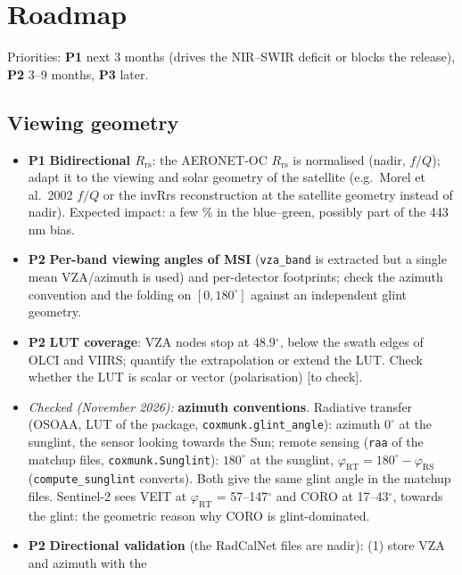 \documentclass[11pt,a4paper]{article}
\newcommand{\Rrs}{R_\mathrm{rs}}
\newcommand{\code}[1]{\texttt{#1}}
\newcommand{\todo}[1]{\textcolor{red!70!black}{[#1]}}
\newcommand{\prio}[1]{\textbf{\textcolor{blue!50!black}{#1}}}
\begin{document}
\section{Roadmap}

Priorities: \prio{P1} next 3 months (drives the NIR--SWIR deficit or blocks the release),
\prio{P2} 3--9 months, \prio{P3} later.

\subsection{Viewing geometry}
\begin{itemize}
\item \prio{P1} \textbf{Bidirectional $\Rrs$}: the AERONET-OC $\Rrs$ is normalised (nadir, $f/Q$); adapt it to the
  viewing and solar geometry of the satellite (e.g.\ Morel et al.\ 2002 $f/Q$ or the invRrs reconstruction at
  the satellite geometry instead of nadir). Expected impact: a few \% in the blue--green, possibly part of the
  443\,nm bias.
\item \prio{P2} \textbf{Per-band viewing angles of MSI} (\code{vza\_band} is extracted but a single mean VZA/azimuth
  is used) and per-detector footprints; check the azimuth convention and the folding on $[0,180^\circ]$ against
  an independent glint geometry.
\item \prio{P2} \textbf{LUT coverage}: VZA nodes stop at 48.9$^\circ$, below the swath edges of OLCI and VIIRS;
  quantify the extrapolation or extend the LUT. Check whether the LUT is scalar or vector (polarisation)
  \todo{to check}.
\item \textit{Checked (November 2026):} \textbf{azimuth conventions}. Radiative transfer (OSOAA, LUT of the
  package, \code{coxmunk.glint\_angle}): azimuth $0^\circ$ at the sunglint, the sensor looking towards the Sun; remote
  sensing (\code{raa} of the matchup files, \code{coxmunk.Sunglint}): $180^\circ$ at the sunglint,
  $\varphi_\mathrm{RT} = 180^\circ - \varphi_\mathrm{RS}$ (\code{compute\_sunglint} converts). Both give the same glint
  angle in the matchup files. Sentinel-2 sees VEIT at $\varphi_\mathrm{RT}$ = 57--147$^\circ$ and CORO at
  17--43$^\circ$, towards the glint: the geometric reason why CORO is glint-dominated.
\item \prio{P2} \textbf{Directional validation} (the RadCalNet files are nadir): (1) store VZA and azimuth with the

\end{itemize}
\end{document}
